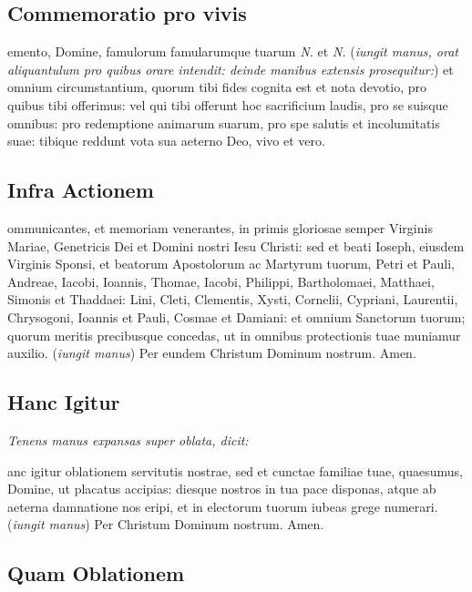 \subsection{Commemoratio pro vivis}

emento, Domine, famulorum famularumque tuarum \textit{N.} et
\textit{N.} (\textit{iungit manus, orat aliquantulum pro quibus orare intendit:
deinde manibus extensis prosequitur:}) et omnium circumstantium, quorum tibi
fides cognita est et nota devotio, pro quibus tibi offerimus: vel qui tibi
offerunt hoc sacrificium laudis, pro se suisque omnibus: pro redemptione
animarum suarum, pro spe salutis et incolumitatis suae: tibique reddunt vota sua
aeterno Deo, vivo et vero.

\subsection{Infra Actionem}

ommunicantes, et memoriam venerantes, in primis gloriosae semper
Virginis Mariae, Genetricis Dei et Domini nostri Iesu Christi: sed et beati
Ioseph, eiusdem Virginis Sponsi, et beatorum Apostolorum ac Martyrum tuorum,
Petri et Pauli, Andreae, Iacobi, Ioannis, Thomae, Iacobi, Philippi,
Bartholomaei, Matthaei, Simonis et Thaddaei: Lini, Cleti, Clementis, Xysti,
Cornelii, Cypriani, Laurentii, Chrysogoni, Ioannis et Pauli, Cosmae et Damiani:
et omnium Sanctorum tuorum; quorum meritis precibusque concedas, ut in omnibus
protectionis tuae muniamur auxilio.  (\textit{iungit manus}) Per eundem Christum
Dominum nostrum.  Amen.

\subsection{Hanc Igitur}

\textit{Tenens manus expansas super oblata, dicit:}

\sinus

anc igitur oblationem servitutis nostrae, sed et cunctae familiae
tuae, quaesumus, Domine, ut placatus accipias: diesque nostros in tua pace
disponas, atque ab aeterna damnatione nos eripi, et in electorum tuorum iubeas
grege numerari.  (\textit{iungit manus}) Per Christum Dominum nostrum.  Amen.

\subsection{Quam Oblationem}

